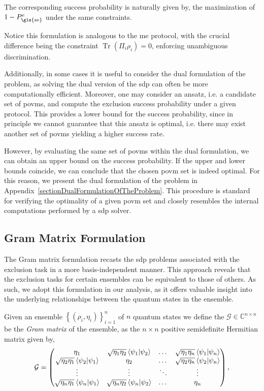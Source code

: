 \documentclass[12pt,letterpaper]{article}
\DeclareMathOperator{\tr}{Tr}
\begin{document}
The corresponding success probability is naturally given by, the maximization of $1-P_{\text{\gls{ze}}}^e$ under the same constraints.

Notice this formulation is analogous to the \gls{me} protocol, with the crucial difference being the constraint $\tr(\Pi_i \rho_i) = 0$, enforcing unambiguous discrimination.

Additionally, in some cases it is useful to consider the dual formulation of the problem, as solving the dual version of the \gls{sdp} can often be more computationally efficient. Moreover, one may consider an ansatz, i.e. a candidate set of \gls{povm}s, and compute the exclusion success probability under a given protocol. This provides a lower bound for the success probability, since in principle we cannot guarantee that this ansatz is optimal, i.e. there may exist another set of \gls{povm}s yielding a higher success rate.

However, by evaluating the same set of \gls{povm}s within the dual formulation, we can obtain an upper bound on the success probability. If the upper and lower bounds coincide, we can conclude that the chosen \gls{povm} set is indeed optimal. For this reason, we present the dual formulation of the problem in Appendix~\ref{sectionDualFormulationOfTheProblem}. This procedure is standard for verifying the optimality of a given \gls{povm} set and closely resembles the internal computations performed by a \gls{sdp} solver.

\subsection{Gram Matrix Formulation}\label{sectionGramMatrixFormulation}
\hspace{20pt}The Gram matrix formulation recasts the \gls{sdp} problems associated with the exclusion task in a more basis-independent manner. This approach reveals that the exclusion tasks for certain ensembles can be equivalent to those of others. As such, we adopt this formulation in our analysis, as it offers valuable insight into the underlying relationships between the quantum states in the ensemble.

Given an ensemble $\left\{(\rho_i, \eta_i)\right\}_{i=1}^n$ of $n$ quantum states we define the $\mathcal{G} \in \mathbb{C}^{n \times n}$ be the \emph{Gram matrix} of the ensemble, as the $n \times n$ positive semidefinite Hermitian matrix given by,
\begin{equation*}
	\mathcal{G} =
	\begin{pmatrix}
		\eta_1 & \sqrt{\eta_1\eta_2}\braket{\psi_1|\psi_2} & \dots & \sqrt{\eta_1\eta_n}\braket{\psi_1|\psi_n} \\
		\sqrt{\eta_2\eta_1}\braket{\psi_2|\psi_1} & \eta_2 & \dots & \sqrt{\eta_2\eta_n}\braket{\psi_2|\psi_n} \\
		\vdots & \vdots & \ddots & \vdots \\
		\sqrt{\eta_n\eta_1}\braket{\psi_n|\psi_1} & \sqrt{\eta_n\eta_2}\braket{\psi_n|\psi_2} & \dots & \eta_n
	\end{pmatrix},
\end{equation*}
\end{document}
